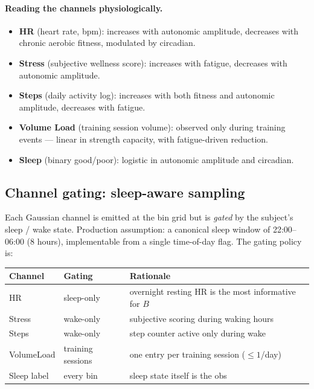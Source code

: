 \documentclass[11pt,a4paper]{article}
\theoremstyle{definition}
\begin{document}
\paragraph{Reading the channels physiologically.}
\begin{itemize}
  \item \textbf{HR} (heart rate, bpm): increases with autonomic
        amplitude, decreases with chronic aerobic fitness, modulated by
        circadian.
  \item \textbf{Stress} (subjective wellness score): increases with
        fatigue, decreases with autonomic amplitude.
  \item \textbf{Steps} (daily activity log): increases with both
        fitness and autonomic amplitude, decreases with fatigue.
  \item \textbf{Volume Load} (training session volume): observed only
        during training events --- linear in strength capacity, with
        fatigue-driven reduction.
  \item \textbf{Sleep} (binary good/poor): logistic in autonomic
        amplitude and circadian.
\end{itemize}

\subsection{Channel gating: sleep-aware sampling} \label{sec:gating}

Each Gaussian channel is emitted at the bin grid but is \emph{gated} by
the subject's sleep / wake state. Production assumption: a canonical
sleep window of 22:00--06:00 (8 hours), implementable from a single
time-of-day flag. The gating policy is:

\begin{center}\small
\begin{tabular}{lll}
\toprule
Channel & Gating & Rationale \\
\midrule
HR     & sleep-only       & overnight resting HR is the most informative for $B$ \\
Stress & wake-only        & subjective scoring during waking hours \\
Steps  & wake-only        & step counter active only during wake \\
VolumeLoad & training sessions & one entry per training session ($\le 1$/day) \\
Sleep label & every bin    & sleep state itself is the obs \\
\bottomrule
\end{tabular}
\end{center}
\end{document}
